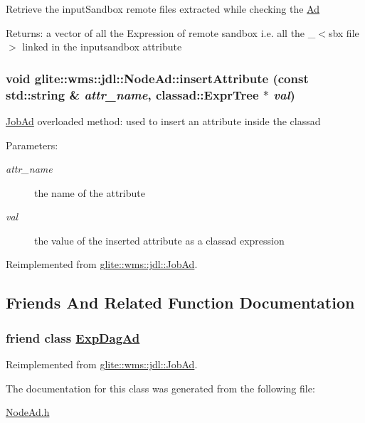 Retrieve the input\-Sandbox remote files extracted while checking the \hyperlink{classglite_1_1wms_1_1jdl_1_1Ad}{Ad} \begin{Desc}
\item[Returns:]a vector of all the Expression of remote sandbox i.e. all the \_\-$<$sbx file$>$ linked in the inputsandbox attribute\end{Desc}
\hypertarget{classglite_1_1wms_1_1jdl_1_1NodeAd_b2}{
\subsubsection[insertAttribute]{\setlength{\rightskip}{0pt plus 5cm}void glite::wms::jdl::Node\-Ad::insert\-Attribute (const std::string \& {\em attr\_\-name}, classad::Expr\-Tree $\ast$ {\em val})}}
\label{classglite_1_1wms_1_1jdl_1_1NodeAd_b2}


\hyperlink{classglite_1_1wms_1_1jdl_1_1JobAd}{Job\-Ad} overloaded method: used to insert an attribute inside the classad \begin{Desc}
\item[Parameters:]
\begin{description}
\item[{\em attr\_\-name}]the name of the attribute \item[{\em val}]the value of the inserted attribute as a classad expression\end{description}
\end{Desc}


Reimplemented from \hyperlink{classglite_1_1wms_1_1jdl_1_1JobAd_b2}{glite::wms::jdl::Job\-Ad}.

\subsection{Friends And Related Function Documentation}
\hypertarget{classglite_1_1wms_1_1jdl_1_1NodeAd_n0}{
\subsubsection[ExpDagAd]{\setlength{\rightskip}{0pt plus 5cm}friend class \hyperlink{classglite_1_1wms_1_1jdl_1_1ExpDagAd}{Exp\-Dag\-Ad}}}
\label{classglite_1_1wms_1_1jdl_1_1NodeAd_n0}




Reimplemented from \hyperlink{classglite_1_1wms_1_1jdl_1_1JobAd_n1}{glite::wms::jdl::Job\-Ad}.

The documentation for this class was generated from the following file:\begin{CompactItemize}
\item 
\hyperlink{NodeAd_8h}{Node\-Ad.h}\end{CompactItemize}
